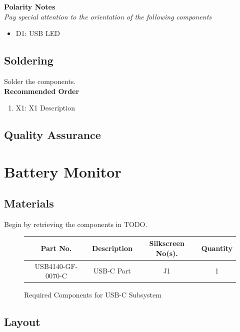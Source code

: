 \documentclass{article}
\begin{document}
\noindent \textbf{Polarity Notes}\\
\noindent \textit{Pay special attention to the orientation of the following components}
\begin{itemize}
  \item D1: USB LED
\end{itemize}

\subsection{Soldering}

Solder the components. \\

\noindent \textbf{Recommended Order}

\begin{enumerate}
  \item X1: X1 Description
\end{enumerate}
\subsection{Quality Assurance}

\section{Battery Monitor}

\subsection{Materials}
Begin by retrieving the components in TODO.

\begin{figure}[H]
    \begin{center}
        \begin{tabular}{ c|c|c|c } 
            \textbf{Part No.} & \textbf{Description} & \textbf{Silkscreen No(s).} & \textbf{Quantity} \\ 
            \hline
            USB4140-GF-0070-C & USB-C Port & J1 & 1 \\ 
        \end{tabular}
    \end{center}
    \caption{Required Components for USB-C Subsystem}
    \label{tbl:TODO-materials}
\end{figure}

\subsection{Layout}
\end{document}
